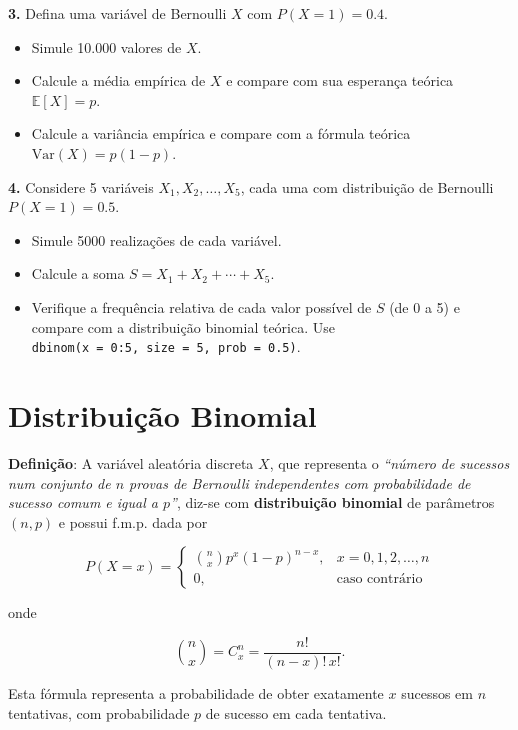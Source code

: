 \documentclass[
]{book}
\providecommand{\tightlist}{%
  \setlength{\itemsep}{0pt}\setlength{\parskip}{0pt}}
\begin{document}
\textbf{3.} Defina uma variável de Bernoulli \(X\) com \(P(X = 1) = 0.4\).

\begin{itemize}
\tightlist
\item
  Simule 10.000 valores de \(X\).
\item
  Calcule a média empírica de \(X\) e compare com sua esperança teórica \(\mathbb{E}[X] = p\).
\item
  Calcule a variância empírica e compare com a fórmula teórica \(\text{Var}(X) = p(1 - p)\).
\end{itemize}

\textbf{4.} Considere 5 variáveis \(X_1, X_2, \ldots, X_5\), cada uma com distribuição de Bernoulli \(P(X = 1) = 0.5\).

\begin{itemize}
\tightlist
\item
  Simule 5000 realizações de cada variável.
\item
  Calcule a soma \(S = X_1 + X_2 + \cdots + X_5\).
\item
  Verifique a frequência relativa de cada valor possível de \(S\) (de 0 a 5) e compare com a distribuição binomial teórica. Use \texttt{dbinom(x\ =\ 0:5,\ size\ =\ 5,\ prob\ =\ 0.5)}.
\end{itemize}

\section{Distribuição Binomial}\label{distribuiuxe7uxe3o-binomial}

\textbf{Definição}: A variável aleatória discreta \(X\), que representa o \emph{``número de sucessos num conjunto de \(n\) provas de Bernoulli independentes com probabilidade de sucesso comum e igual a \(p\)''}, diz-se com \textbf{distribuição binomial} de parâmetros \((n, p)\) e possui f.m.p. dada por

\[
P(X = x) = 
\begin{cases} 
\binom{n}{x} p^x (1 - p)^{n - x}, & x = 0, 1, 2, \ldots, n \\ 
0, & \text{caso contrário}
\end{cases}
\]

onde

\[
\binom{n}{x} = C_x^n = \frac{n!}{(n - x)! \, x!}.
\]

Esta fórmula representa a probabilidade de obter exatamente \(x\) sucessos em \(n\) tentativas, com probabilidade \(p\) de sucesso em cada tentativa.
\end{document}
